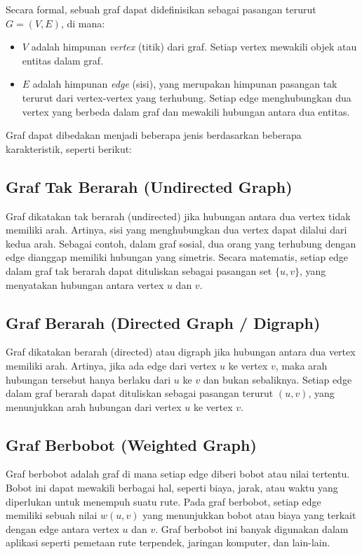 Secara formal, sebuah graf dapat didefinisikan sebagai pasangan terurut \( G = (V, E) \), di mana:

\begin{itemize}
    \item \( V \) adalah himpunan \emph{vertex} (titik) dari graf. Setiap vertex mewakili objek atau entitas dalam graf.
    \item \( E \) adalah himpunan \emph{edge} (sisi), yang merupakan himpunan pasangan tak terurut dari vertex-vertex yang terhubung. Setiap edge menghubungkan dua vertex yang berbeda dalam graf dan mewakili hubungan antara dua entitas.
\end{itemize}

Graf dapat dibedakan menjadi beberapa jenis berdasarkan beberapa karakteristik, seperti berikut:

\subsection{Graf Tak Berarah (Undirected Graph)}
Graf dikatakan tak berarah (undirected) jika hubungan antara dua vertex tidak memiliki arah. Artinya, sisi yang menghubungkan dua vertex dapat dilalui dari kedua arah. Sebagai contoh, dalam graf sosial, dua orang yang terhubung dengan edge dianggap memiliki hubungan yang simetris. Secara matematis, setiap edge dalam graf tak berarah dapat dituliskan sebagai pasangan set \( \{ u, v \} \), yang menyatakan hubungan antara vertex \( u \) dan \( v \).

\subsection{Graf Berarah (Directed Graph / Digraph)}
Graf dikatakan berarah (directed) atau digraph jika hubungan antara dua vertex memiliki arah. Artinya, jika ada edge dari vertex \( u \) ke vertex \( v \), maka arah hubungan tersebut hanya berlaku dari \( u \) ke \( v \) dan bukan sebaliknya. Setiap edge dalam graf berarah dapat dituliskan sebagai pasangan terurut \( (u, v) \), yang menunjukkan arah hubungan dari vertex \( u \) ke vertex \( v \).

\subsection{Graf Berbobot (Weighted Graph)}
Graf berbobot adalah graf di mana setiap edge diberi bobot atau nilai tertentu. Bobot ini dapat mewakili berbagai hal, seperti biaya, jarak, atau waktu yang diperlukan untuk menempuh suatu rute. Pada graf berbobot, setiap edge memiliki sebuah nilai \( w(u, v) \) yang menunjukkan bobot atau biaya yang terkait dengan edge antara vertex \( u \) dan \( v \). Graf berbobot ini banyak digunakan dalam aplikasi seperti pemetaan rute terpendek, jaringan komputer, dan lain-lain.

